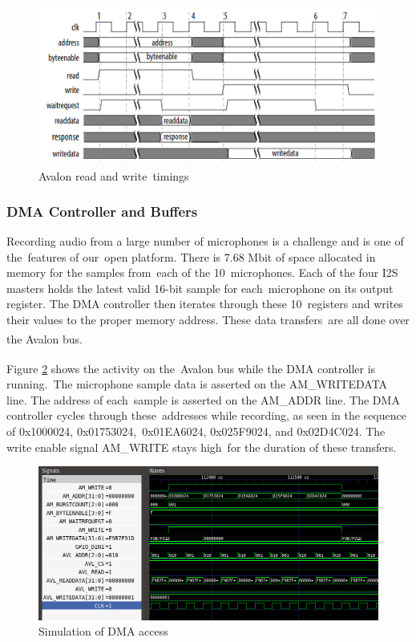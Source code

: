 \documentclass{article}
\begin{document}
\begin{figure}[ht]
	\includegraphics[scale=.5]{pictures/avalon.png}
	\centering

	\caption{Avalon\textsuperscript{\textregistered{}} read and write\
	timings \cite{avalon}}

	\label{avalon}
\end{figure}


\subsubsection{DMA Controller and Buffers}
Recording audio from a large number of microphones is a challenge and is one of the\
features of our\
open platform. There is 7.68 Mbit of space allocated in memory for the samples from\
each of the 10\
microphones. Each of the four I2S masters holds the latest valid 16-bit sample for each\
microphone on its output register. The DMA controller then iterates through these 10\
registers and writes their values to the proper memory address.  These data transfers\
are all done over the Avalon\textsuperscript{\textregistered{}} bus. \

Figure \ref{dma_sim} shows the activity on the\
Avalon\textsuperscript{\textregistered{}} bus while the DMA controller is running.\
The microphone sample data is asserted on the AM\_WRITEDATA line.  The address of each\
sample is asserted on the AM\_ADDR line.  The DMA controller cycles through these\
addresses while recording, as seen in the sequence of 0x1000024, 0x01753024,\
0x01EA6024, 0x025F9024, and 0x02D4C024. The write enable signal AM\_WRITE stays high\
for the duration of these transfers.

\begin{figure}[ht]
	\begin{center}
	\includegraphics[scale=.38]{pictures/sim_close.png}
	\caption{Simulation of DMA access}
	\label{dma_sim}
	\end{center}
\end{figure}
\end{document}
